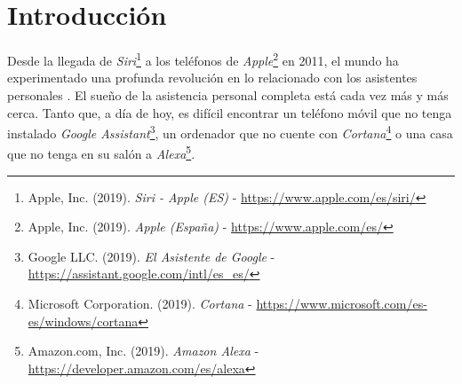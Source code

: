 \documentclass[11pt,spanish,listoffigures]{tfgetsinf}
\begin{document}
\clearpage
\begin{abstract}[english]
The work carried out has consisted in the design and implementation of a conversational bot following the proper patterns of the serverless architecture. To do this, cloud computing tools provided by \textit{Amazon Web Services} have been used, as well as the \textit{Dialogflow} development environment. \textit{Dialogflow} is a suite executed on \textit{Google Cloud} that allows to facilitate the human-computer interaction offering a simple and effective development with which to interpret the natural language. The application's back-end, a weather consultant, has been designed to be fully executed on the \textit{Amazon} cloud. The code, mostly written in \textit{Python}, but also in \textit{Javascript}, is executed through \textit{Lambda} functions and invoked thanks to the \textit{Gateway API}. On the other hand, the front-end, developed using the \textit{Vue.js} framework, is stored in \textit{S3} and allows authentication through \textit{Cognito}. As a result of the work, it has been obtained an application that allows deepening on the creation of conversational bots, as well as exploiting the use of serverless architectures to obtain efficient results at low cost.
\end{abstract}


\mainmatter





\chapter{Introducci\'on}
\label{ch:intro}

Desde la llegada de \textit{Siri}\footnote{Apple, Inc. (2019). \textit{Siri - Apple (ES)} -  \url{https://www.apple.com/es/siri/}} a los teléfonos de \textit{Apple}\footnote{Apple, Inc. (2019). \textit{Apple (España)} - \url{https://www.apple.com/es/}} en 2011, el mundo ha experimentado una profunda revolución en lo relacionado con los asistentes personales \cite{assistants}. El sueño de la asistencia personal completa está cada vez más y más cerca. Tanto que, a día de hoy, es difícil encontrar un teléfono móvil que no tenga instalado \textit{Google Assistant}\footnote{Google LLC. (2019). \textit{El Asistente de Google} - \url{https://assistant.google.com/intl/es_es/}}, un ordenador que no cuente con \textit{Cortana}\footnote{Microsoft Corporation. (2019). \textit{Cortana} - \url{https://www.microsoft.com/es-es/windows/cortana}} o una casa que no tenga en su salón a \textit{Alexa}\footnote{Amazon.com, Inc. (2019). \textit{Amazon Alexa} - \url{https://developer.amazon.com/es/alexa}}.
\end{document}
